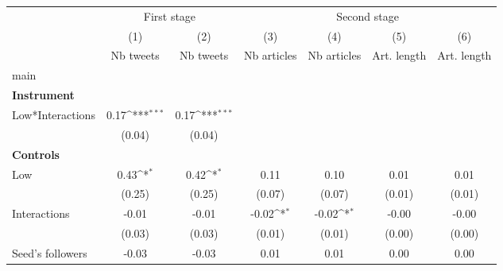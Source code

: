 {
\def\sym#1{\ifmmode^{#1}\else\(^{#1}\)\fi}
\begin{tabular}{l*{6}{c}}
\hline\hline
                    &\multicolumn{2}{c}{First stage}            &\multicolumn{4}{c}{Second stage}                                                       \\\cmidrule(lr){2-3}\cmidrule(lr){4-7}
                    &\multicolumn{1}{c}{(1)}&\multicolumn{1}{c}{(2)}&\multicolumn{1}{c}{(3)}&\multicolumn{1}{c}{(4)}&\multicolumn{1}{c}{(5)}&\multicolumn{1}{c}{(6)}\\
                    &\multicolumn{1}{c}{Nb tweets}&\multicolumn{1}{c}{Nb tweets}&\multicolumn{1}{c}{Nb articles}&\multicolumn{1}{c}{Nb articles}&\multicolumn{1}{c}{Art. length}&\multicolumn{1}{c}{Art. length}\\
\hline
main                &                     &                     &                     &                     &                     &                     \\
\textbf{Instrument} &                     &                     &                     &                     &                     &                     \\
Low*Interactions    &        0.17\sym{***}&        0.17\sym{***}&                     &                     &                     &                     \\
                    &      (0.04)         &      (0.04)         &                     &                     &                     &                     \\
\textbf{Controls}   &                     &                     &                     &                     &                     &                     \\
Low                 &        0.43\sym{*}  &        0.42\sym{*}  &        0.11         &        0.10         &        0.01         &        0.01         \\
                    &      (0.25)         &      (0.25)         &      (0.07)         &      (0.07)         &      (0.01)         &      (0.01)         \\
Interactions        &       -0.01         &       -0.01         &       -0.02\sym{*}  &       -0.02\sym{*}  &       -0.00         &       -0.00         \\
                    &      (0.03)         &      (0.03)         &      (0.01)         &      (0.01)         &      (0.00)         &      (0.00)         \\
Seed’s followers    &       -0.03         &       -0.03         &        0.01         &        0.01         &        0.00         &        0.00         \\

\end{tabular}}
